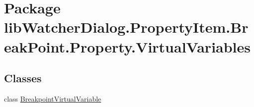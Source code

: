 \hypertarget{namespacelib_watcher_dialog_1_1_property_item_1_1_break_point_1_1_property_1_1_virtual_variables}{\section{Package lib\+Watcher\+Dialog.\+Property\+Item.\+Break\+Point.\+Property.\+Virtual\+Variables}
\label{namespacelib_watcher_dialog_1_1_property_item_1_1_break_point_1_1_property_1_1_virtual_variables}
}
\subsection*{Classes}
\begin{DoxyCompactItemize}
\item 
class \hyperlink{classlib_watcher_dialog_1_1_property_item_1_1_break_point_1_1_property_1_1_virtual_variables_1_1_breakpoint_virtual_variable}{Breakpoint\+Virtual\+Variable}
\end{DoxyCompactItemize}
